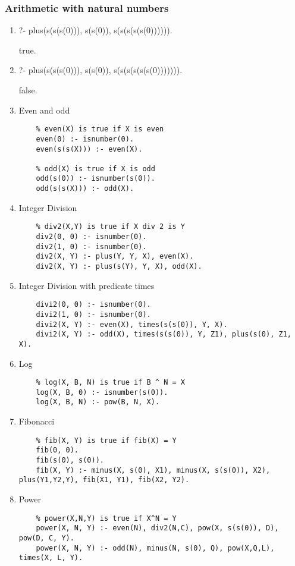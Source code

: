 \documentclass{article}
\begin{document}
	\subsubsection*{Arithmetic with natural numbers}
	\begin{enumerate}
	\item ?- plus(s(s(s(0))), s(s(0)), s(s(s(s(s(0)))))).
	
	true.
	\item ?- plus(s(s(s(0))), s(s(0)), s(s(s(s(s(s(0))))))).
	
	false.
	\item Even and odd
	\begin{lstlisting}
	% even(X) is true if X is even
	even(0) :- isnumber(0).
	even(s(s(X))) :- even(X).
	
	% odd(X) is true if X is odd
	odd(s(0)) :- isnumber(s(0)).
	odd(s(s(X))) :- odd(X).
	\end{lstlisting}
	\item Integer Division
	\begin{lstlisting}
	% div2(X,Y) is true if X div 2 is Y
	div2(0, 0) :- isnumber(0).
	div2(1, 0) :- isnumber(0).
	div2(X, Y) :- plus(Y, Y, X), even(X).
	div2(X, Y) :- plus(s(Y), Y, X), odd(X).
	\end{lstlisting}
	\item Integer Division with predicate times
	\begin{lstlisting}
	divi2(0, 0) :- isnumber(0).
	divi2(1, 0) :- isnumber(0).
	divi2(X, Y) :- even(X), times(s(s(0)), Y, X).
	divi2(X, Y) :- odd(X), times(s(s(0)), Y, Z1), plus(s(0), Z1, X).
	\end{lstlisting}
	\item Log
	\begin{lstlisting}
	% log(X, B, N) is true if B ^ N = X
	log(X, B, 0) :- isnumber(s(0)).
	log(X, B, N) :- pow(B, N, X).
	\end{lstlisting}
	\item Fibonacci
	\begin{lstlisting}
	% fib(X, Y) is true if fib(X) = Y
	fib(0, 0).
	fib(s(0), s(0)).
	fib(X, Y) :- minus(X, s(0), X1), minus(X, s(s(0)), X2), plus(Y1,Y2,Y), fib(X1, Y1), fib(X2, Y2).
	\end{lstlisting}
	\item Power
	\begin{lstlisting}
	% power(X,N,Y) is true if X^N = Y
	power(X, N, Y) :- even(N), div2(N,C), pow(X, s(s(0)), D), pow(D, C, Y).
	power(X, N, Y) :- odd(N), minus(N, s(0), Q), pow(X,Q,L), times(X, L, Y).
	\end{lstlisting}
	\end{enumerate}
	
\end{document}
